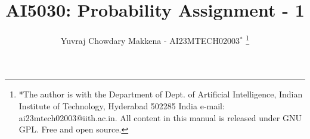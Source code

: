 \documentclass{IEEEtran}
\begin{document}
%




% 
%





\title{
    AI5030: Probability Assignment - 1
}
\author{ Yuvraj Chowdary Makkena - AI23MTECH02003$^{*}$%
	\thanks{*The author is with the Department
		of Dept. of Artificial Intelligence, Indian Institute of Technology, Hyderabad
		502285 India e-mail:  ai23mtech02003@iith.ac.in. All content in this manual is released under GNU GPL.  Free and open source.}
	
}	


%
%
%

% 
%
\end{document}

